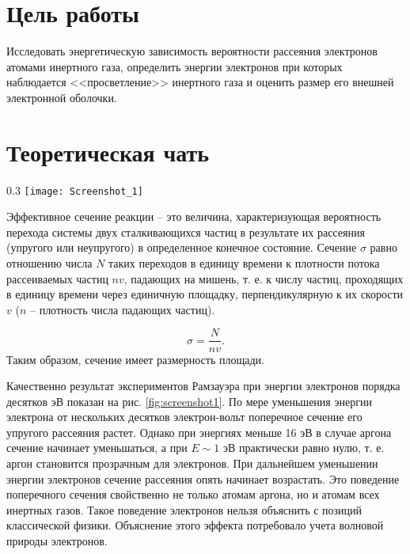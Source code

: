


    

    \section*{Цель работы}

    Исследовать энергетическую зависимость вероятности рассеяния электронов атомами инертного газа, 
    определить энергии электронов при которых наблюдается <<просветление>> инертного газа и 
    оценить размер его внешней электронной оболочки.

    \section*{Теоретическая чать}

    \begin{wrapfigure}{}{0.3\textwidth}
        \texttt{[image: Screenshot\_1]}
        \caption{Качественная картина результатов измерения упругого рассеяния электронов в аргоне}
        \label{fig:screenshot1}
    \end{wrapfigure}

    Эффективное сечение реакции -- это величина, характеризующая вероятность перехода системы двух 
    сталкивающихся частиц в результате их рассеяния (упругого или неупругого) в 
    определенное конечное состояние. 
    Сечение $ \sigma $ равно отношению числа $ N $ таких переходов в единицу времени к плотности потока рассеиваемых частиц 
    $ n v $, падающих на мишень, т. е. к числу частиц, проходящих в единицу времени 
    через единичную площадку, перпендикулярную к их скорости $ v $ ($ n $ -- плотность числа падающих частиц).
    
    \begin{equation}\label{eq:sigma}
        \sigma = \frac{N}{n v}.
    \end{equation}
    Таким образом, сечение имеет размерность площади.

    Качественно результат экспериментов Рамзауэра при энергии электронов порядка десятков эВ показан на рис. 
    \ref{fig:screenshot1}.
    По мере уменьшения энергии электрона от нескольких десятков электрон-вольт поперечное сечение его 
    упругого рассеяния растет. Однако при энергиях меньше 16 эВ в случае аргона сечение начинает уменьшаться, 
    а при $ E \sim 1 $ эВ практически равно нулю, т. е. аргон становится прозрачным для электронов. 
    При дальнейшем уменьшении энергии электронов сечение рассеяния опять начинает возрастать. 
    Это поведение поперечного сечения свойственно не только атомам аргона, но и атомам всех инертных газов. 
    Такое поведение электронов нельзя объяснить с позиций классической физики. 
    Объяснение этого эффекта потребовало учета волновой природы электронов.

